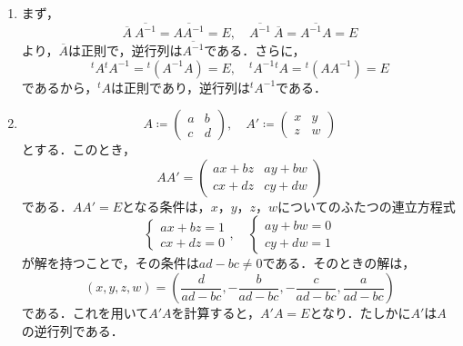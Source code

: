 \documentclass[uplatex,dvipdfmx,a4paper,11pt,fleqn]{jsarticle}
\begin{document}
    \begin{leftbar}
        \begin{enumerate}
            \item 
        まず，
        \[
            \overline{A} \ \overline{A^{-1}} = \overline{A A^{-1}}=E,\quad \overline{A^{-1}} \ \overline{A} =\overline{A^{-1} A}=E
        \]
        より，$\overline{A}$は正則で，逆行列は$\overline{A^{-1}}$である．さらに，
        \[
            {}^t A {}^t A^{-1} ={}^t (A^{-1} A)=E,\quad {}^t A^{-1} {}^t A = {}^t (A A^{-1})=E
        \]
        であるから，${}^t A$は正則であり，逆行列は${}^t A^{-1}$である．
        \item 
        \[
            A \coloneqq \begin{pmatrix} a & b \\ c & d \end{pmatrix},\quad A' \coloneqq \begin{pmatrix} x & y \\ z & w \end{pmatrix}
        \]
        とする．このとき，
        \[
            A A' = \begin{pmatrix} a x + b z & ay + bw \\ cx + dz & cy +dw \end{pmatrix}
        \]
        である．$AA'=E$となる条件は，$x$，$y$，$z$，$w$についてのふたつの連立方程式
        \[
            \begin{cases}
                ax+bz =1 \\
                cx+dz =0
            \end{cases}
            ,\quad 
            \begin{cases}
                ay+bw=0\\
                cy+dw=1
            \end{cases}
        \]
        が解を持つことで，その条件は$ad-bc \ne 0$である．そのときの解は，
        \[
            (x,y,z,w)=  (\frac{d}{ad-bc},-\frac{b}{ad-bc},-\frac{c}{ad-bc},\frac{a}{ad-bc})
        \]
        である．これを用いて$A'A$を計算すると，$A' A =E$となり．たしかに$A'$は$A$の逆行列である．
    

\end{enumerate}
\end{leftbar}
\end{document}
